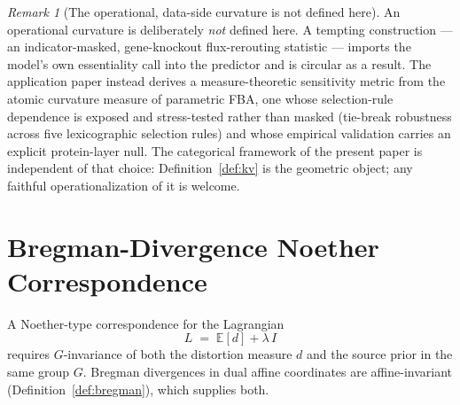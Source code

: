 \documentclass[11pt,a4paper]{article}
\theoremstyle{plain}
\theoremstyle{definition}
\theoremstyle{remark}
\newtheorem{remark}[theorem]{Remark}
\begin{document}
\begin{remark}[The operational, data-side curvature is not defined here]
\label{rem:fba-kappa-superseded}
An operational curvature is deliberately \emph{not} defined here. A tempting construction --- an indicator-masked, gene-knockout flux-rerouting statistic --- imports the model's own essentiality call into the predictor and is circular as a result. The application paper \citep{zai2026measure} instead derives a measure-theoretic sensitivity metric from the atomic curvature measure of parametric FBA, one whose selection-rule dependence is exposed and stress-tested rather than masked (tie-break robustness across five lexicographic selection rules) and whose empirical validation carries an explicit protein-layer null. The categorical framework of
the present paper is independent of that choice: Definition~\ref{def:kv}
is the geometric object; any faithful operationalization of it is
welcome.
\end{remark}


\section{Bregman-Divergence Noether Correspondence}\label{sec:noether}

A Noether-type correspondence for the Lagrangian
\begin{equation}\label{eq:lagrangian}
  L \;=\; \mathbb{E}[d] + \lambda\, I
\end{equation}
requires $G$-invariance of both the distortion measure $d$ and the
source prior in the same group $G$. Bregman divergences in dual affine
coordinates are affine-invariant (Definition~\ref{def:bregman}), which
supplies both.
\end{document}
